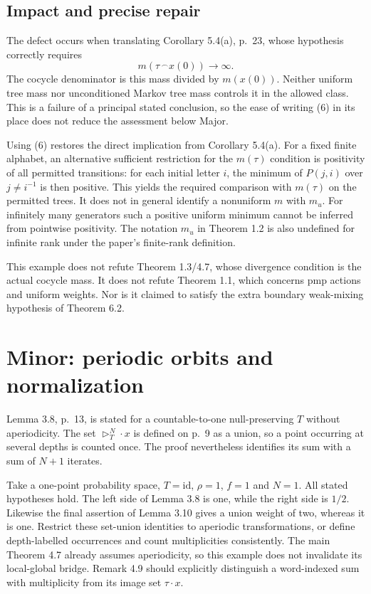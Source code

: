 \documentclass[10pt]{article}
\begin{document}
\subsection*{Impact and precise repair}
The defect occurs when translating Corollary 5.4(a), p. 23, whose hypothesis correctly requires \[m(\tau\,^{\frown}x(0))\longrightarrow\infty.
 \tag{6}\] The cocycle denominator is this mass divided by \(m(x(0))\). Neither uniform tree mass nor unconditioned Markov tree mass controls it in the allowed class. This is a failure of a principal stated conclusion, so the ease of writing (6) in its place does not reduce the assessment below Major.\par
Using (6) restores the direct implication from Corollary 5.4(a). For a fixed finite alphabet, an alternative sufficient restriction for the \(m(\tau)\) condition is positivity of all permitted transitions: for each initial letter \(i\), the minimum of \(P(j,i)\) over \(j\ne i^{-1}\) is then positive. This yields the required comparison with \(m(\tau)\) on the permitted trees. It does not in general identify a nonuniform \(m\) with \(m_u\). For infinitely many generators such a positive uniform minimum cannot be inferred from pointwise positivity. The notation \(m_u\) in Theorem 1.2 is also undefined for infinite rank under the paper’s finite-rank definition.\par
This example does not refute Theorem 1.3/4.7, whose divergence condition is the actual cocycle mass. It does not refute Theorem 1.1, which concerns pmp actions and uniform weights. Nor is it claimed to satisfy the extra boundary weak-mixing hypothesis of Theorem 6.2.\par
\section*{Minor: periodic orbits and normalization}
Lemma 3.8, p. 13, is stated for a countable-to-one null-preserving \(T\) without aperiodicity. The set \(\triangleright_T^N\cdot x\) is defined on p. 9 as a union, so a point occurring at several depths is counted once. The proof nevertheless identifies its sum with a sum of \(N+1\) iterates.\par
Take a one-point probability space, \(T=\mathrm{id}\), \(\rho=1\), \(f=1\) and \(N=1\). All stated hypotheses hold. The left side of Lemma 3.8 is one, while the right side is \(1/2\). Likewise the final assertion of Lemma 3.10 gives a union weight of two, whereas it is one. Restrict these set-union identities to aperiodic transformations, or define depth-labelled occurrences and count multiplicities consistently. The main Theorem 4.7 already assumes aperiodicity, so this example does not invalidate its local-global bridge. Remark 4.9 should explicitly distinguish a word-indexed sum with multiplicity from its image set \(\tau\cdot x\).\par
\end{document}
